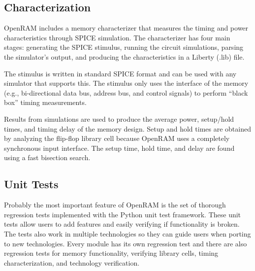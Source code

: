 \subsection{Characterization}

OpenRAM includes a memory characterizer that measures the timing and
power characteristics through SPICE simulation. The
characterizer has four main stages: generating the SPICE stimulus,
running the circuit simulations, parsing the simulator's output, and
producing the characteristics in a Liberty (.lib) file. 

The stimulus is written in standard SPICE format and can be used with
any simulator that supports this. The stimulus only uses the
interface of the memory (e.g., bi-directional data bus, address bus,
and control signals) to perform \enquote{black box} timing measurements.

Results from simulations are used to produce the average power,
setup/hold times, and timing delay of the memory design. Setup and
hold times are obtained by analyzing the flip-flop library cell
because OpenRAM uses a completely synchronous input interface. The
setup time, hold time, and delay are found using a fast bisection
search.

\subsection{Unit Tests}

Probably the most important feature of OpenRAM is the set of thorough
regression tests implemented with the Python unit test framework.
These unit tests allow users to add features and easily verifying if
functionality is broken. The tests also work in multiple technologies
so they can guide users when porting to new technologies. Every module
has its own regression test and there are also regression tests for
memory functionality, verifying library cells, timing
characterization, and technology verification.

